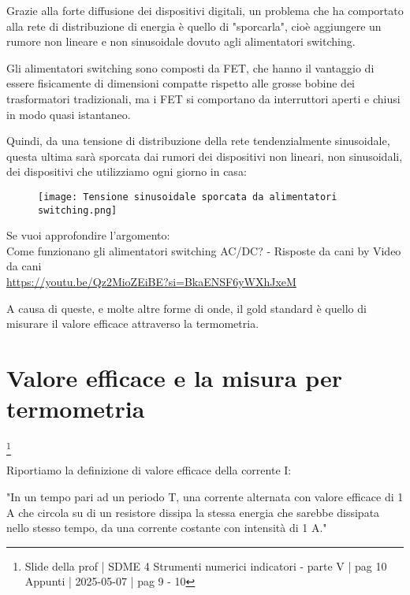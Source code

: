 Grazie alla forte diffusione dei dispositivi digitali, 
un problema che ha comportato alla rete di distribuzione di energia è quello di "sporcarla", 
cioè aggiungere un rumore non lineare e non sinusoidale dovuto agli alimentatori switching. \newline 

Gli alimentatori switching sono composti da FET, che hanno il vantaggio di essere fisicamente di dimensioni compatte rispetto alle grosse bobine 
dei trasformatori tradizionali, ma i FET si comportano da interruttori aperti e chiusi in modo quasi istantaneo. \newline 

Quindi, da una tensione di distribuzione della rete tendenzialmente sinusoidale, questa ultima sarà sporcata dai rumori dei dispositivi non lineari, non sinusoidali, 
dei dispositivi che utilizziamo ogni giorno in casa: 

\begin{figure}[h]
    \centering
    \texttt{[image: Tensione sinusoidale sporcata da alimentatori switching.png]}
\end{figure}

\begin{tcolorbox}
    Se vuoi approfondire l'argomento: \\ 
    Come funzionano gli alimentatori switching AC/DC? - Risposte da cani by Video da cani \\ 
    \url{https://youtu.be/Qz2MioZEiBE?si=BkaENSF6yWXhJxeM}
\end{tcolorbox}

A causa di queste, e molte altre forme di onde, il gold standard è quello di misurare il valore efficace attraverso la termometria. \newline 

\newpage 

\section{Valore efficace e la misura per termometria}
\footnote{Slide della prof | SDME 4 Strumenti numerici indicatori - parte V | pag 10\\  
Appunti | 2025-05-07 | pag 9 - 10} 

Riportiamo la definizione di valore efficace della corrente I: 

"In un tempo pari ad un periodo T, una corrente alternata con valore efficace di 1 A che circola su di un resistore 
dissipa la stessa energia che sarebbe dissipata nello stesso tempo, da una corrente costante con intensità di 1 A." \newline 

